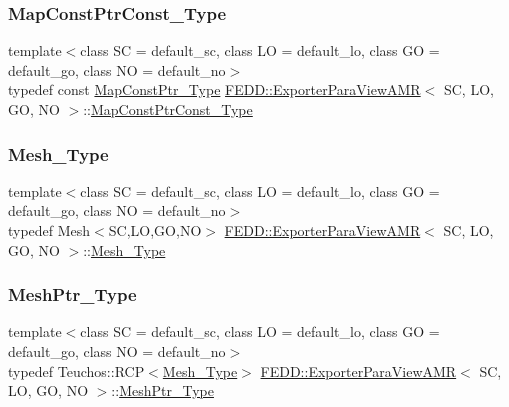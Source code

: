 \subsubsection{\texorpdfstring{Map\+Const\+Ptr\+Const\+\_\+\+Type}{MapConstPtrConst\_Type}}
{\footnotesize\ttfamily template$<$class SC  = default\+\_\+sc, class LO  = default\+\_\+lo, class GO  = default\+\_\+go, class NO  = default\+\_\+no$>$ \\
typedef const \hyperlink{classFEDD_1_1ExporterParaViewAMR_a0b62499b70ea553b391b3436b292a84b}{Map\+Const\+Ptr\+\_\+\+Type} \hyperlink{classFEDD_1_1ExporterParaViewAMR}{F\+E\+D\+D\+::\+Exporter\+Para\+View\+A\+MR}$<$ SC, LO, GO, NO $>$\+::\hyperlink{classFEDD_1_1ExporterParaViewAMR_afb5f7cf35a4a4f028bda4ed0e8ac348c}{Map\+Const\+Ptr\+Const\+\_\+\+Type}}

\mbox{\label{classFEDD_1_1ExporterParaViewAMR_a78bd1d686f0a39bec2918939789bfe70}} 
\subsubsection{\texorpdfstring{Mesh\+\_\+\+Type}{Mesh\_Type}}
{\footnotesize\ttfamily template$<$class SC  = default\+\_\+sc, class LO  = default\+\_\+lo, class GO  = default\+\_\+go, class NO  = default\+\_\+no$>$ \\
typedef Mesh$<$SC,LO,GO,NO$>$ \hyperlink{classFEDD_1_1ExporterParaViewAMR}{F\+E\+D\+D\+::\+Exporter\+Para\+View\+A\+MR}$<$ SC, LO, GO, NO $>$\+::\hyperlink{classFEDD_1_1ExporterParaViewAMR_a78bd1d686f0a39bec2918939789bfe70}{Mesh\+\_\+\+Type}}

\mbox{\label{classFEDD_1_1ExporterParaViewAMR_abdb6338dbd32c5ac33078c866e03bdae}} 
\subsubsection{\texorpdfstring{Mesh\+Ptr\+\_\+\+Type}{MeshPtr\_Type}}
{\footnotesize\ttfamily template$<$class SC  = default\+\_\+sc, class LO  = default\+\_\+lo, class GO  = default\+\_\+go, class NO  = default\+\_\+no$>$ \\
typedef Teuchos\+::\+R\+CP$<$\hyperlink{classFEDD_1_1ExporterParaViewAMR_a78bd1d686f0a39bec2918939789bfe70}{Mesh\+\_\+\+Type}$>$ \hyperlink{classFEDD_1_1ExporterParaViewAMR}{F\+E\+D\+D\+::\+Exporter\+Para\+View\+A\+MR}$<$ SC, LO, GO, NO $>$\+::\hyperlink{classFEDD_1_1ExporterParaViewAMR_abdb6338dbd32c5ac33078c866e03bdae}{Mesh\+Ptr\+\_\+\+Type}}

